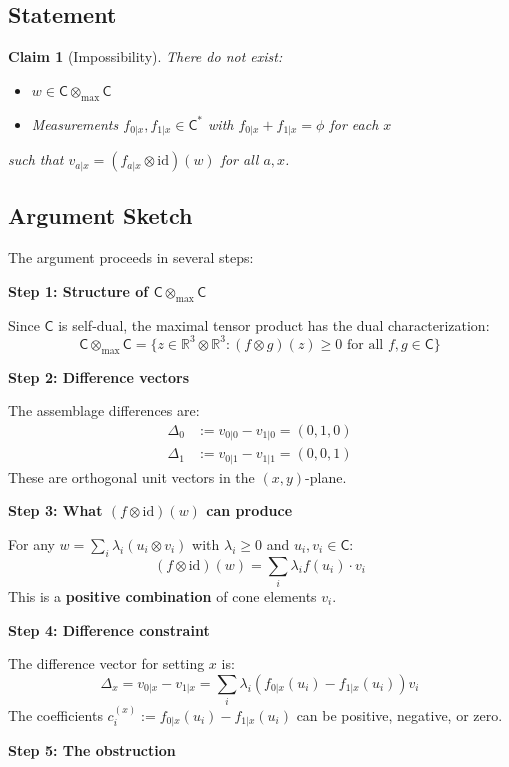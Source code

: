 \documentclass[11pt,a4paper]{article}
\newtheorem{claim}[theorem]{Claim}
\theoremstyle{definition}
\newcommand{\C}{\mathsf{C}}
\newcommand{\Cstar}{\mathsf{C}^*}
\newcommand{\tmax}{\otimes_{\max}}
\newcommand{\R}{\mathbb{R}}
\newcommand{\id}{\mathrm{id}}
\begin{document}
\subsection{Statement}

\begin{claim}[Impossibility]\label{claim:impossible}
There do not exist:
\begin{itemize}
    \item $w \in \C \tmax \C$
    \item Measurements $f_{0|x}, f_{1|x} \in \Cstar$ with $f_{0|x} + f_{1|x} = \phi$ for each $x$
\end{itemize}
such that $v_{a|x} = (f_{a|x} \otimes \id)(w)$ for all $a, x$.
\end{claim}

\subsection{Argument Sketch}

The argument proceeds in several steps:

\textbf{Step 1: Structure of $\C \tmax \C$}

Since $\C$ is self-dual, the maximal tensor product has the dual characterization:
\[
\C \tmax \C = \{z \in \R^3 \otimes \R^3 : (f \otimes g)(z) \geq 0 \text{ for all } f, g \in \C\}
\]

\textbf{Step 2: Difference vectors}

The assemblage differences are:
\begin{align}
\Delta_0 &:= v_{0|0} - v_{1|0} = (0, 1, 0) \\
\Delta_1 &:= v_{0|1} - v_{1|1} = (0, 0, 1)
\end{align}
These are orthogonal unit vectors in the $(x,y)$-plane.

\textbf{Step 3: What $(f \otimes \id)(w)$ can produce}

For any $w = \sum_i \lambda_i (u_i \otimes v_i)$ with $\lambda_i \geq 0$ and $u_i, v_i \in \C$:
\[
(f \otimes \id)(w) = \sum_i \lambda_i f(u_i) \cdot v_i
\]
This is a \textbf{positive combination} of cone elements $v_i$.

\textbf{Step 4: Difference constraint}

The difference vector for setting $x$ is:
\[
\Delta_x = v_{0|x} - v_{1|x} = \sum_i \lambda_i \left(f_{0|x}(u_i) - f_{1|x}(u_i)\right) v_i
\]
The coefficients $c_i^{(x)} := f_{0|x}(u_i) - f_{1|x}(u_i)$ can be positive, negative, or zero.

\textbf{Step 5: The obstruction}
\end{document}
